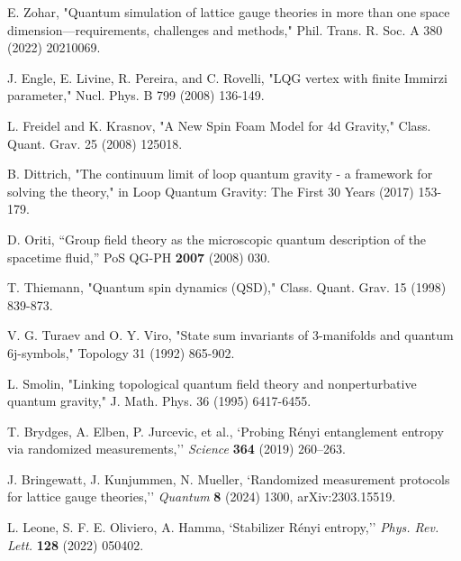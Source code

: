 \documentclass[11pt, a4paper]{article}
\theoremstyle{plain}
\theoremstyle{definition}
\theoremstyle{remark}
\begin{document}
\begin{thebibliography}{99}
 E. Zohar, "Quantum simulation of lattice gauge theories in more than one space dimension—requirements, challenges and methods," Phil. Trans. R. Soc. A 380 (2022) 20210069.

 J. Engle, E. Livine, R. Pereira, and C. Rovelli, "LQG vertex with finite Immirzi parameter," Nucl. Phys. B 799 (2008) 136-149.

 L. Freidel and K. Krasnov, "A New Spin Foam Model for 4d Gravity," Class. Quant. Grav. 25 (2008) 125018.

 B. Dittrich, "The continuum limit of loop quantum gravity - a framework for solving the theory," in Loop Quantum Gravity: The First 30 Years (2017) 153-179.

 D. Oriti, ``Group field theory as the microscopic quantum description of the spacetime fluid,'' PoS QG-PH \textbf{2007} (2008) 030.

 T. Thiemann, "Quantum spin dynamics (QSD)," Class. Quant. Grav. 15 (1998) 839-873.

 V. G. Turaev and O. Y. Viro, "State sum invariants of 3-manifolds and quantum 6j-symbols," Topology 31 (1992) 865-902.

 L. Smolin, "Linking topological quantum field theory and nonperturbative quantum gravity," J. Math. Phys. 36 (1995) 6417-6455.

 T. Brydges, A. Elben, P. Jurcevic, et al., `Probing R\'enyi entanglement entropy via randomized measurements,'' \textit{Science} \textbf{364} (2019) 260--263.

 J. Bringewatt, J. Kunjummen, N. Mueller, `Randomized measurement protocols for lattice gauge theories,'' \textit{Quantum} \textbf{8} (2024) 1300, arXiv:2303.15519.

 L. Leone, S. F. E. Oliviero, A. Hamma, `Stabilizer R\'enyi entropy,'' \textit{Phys. Rev. Lett.} \textbf{128} (2022) 050402.

\end{thebibliography}
\end{document}
